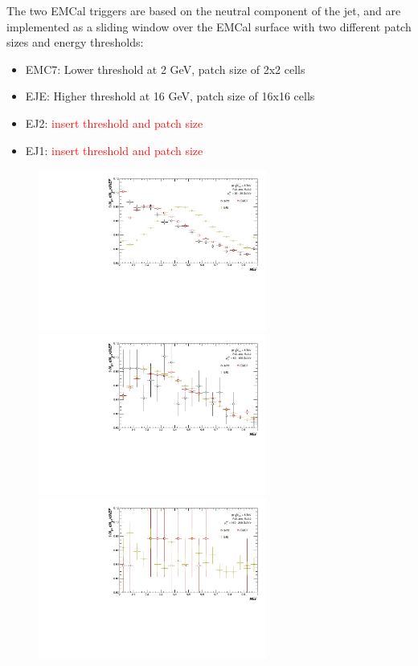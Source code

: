 \documentclass[ALICE]{ALICE_analysis_notes}
\begin{document}
The two EMCal triggers are based on the neutral component of the jet, and are implemented as a sliding window over the EMCal surface with two different patch sizes and energy thresholds:

\begin{itemize}
    \item EMC7: Lower threshold at 2 GeV, patch size of 2x2 cells
    \item EJE: Higher threshold at 16 GeV, patch size of 16x16 cells
    \item EJ2: \textcolor{red}{insert threshold and patch size}
    \item EJ1: \textcolor{red}{insert threshold and patch size}
\end{itemize}

\begin{figure}[h!]
    \centering
    \begin{multicols}{2}
            \includegraphics[width=7.5cm]{figures/NEF/All/hNEF_20-30GeV_R02.pdf}
            \includegraphics[width=7.5cm]{figures/NEF/All/hNEF_60-100GeV_R02.pdf}
            \includegraphics[width=7.5cm]{figures/NEF/All/hNEF_160-240GeV_R02.pdf}

\end{multicols}
\end{figure}
\end{document}
